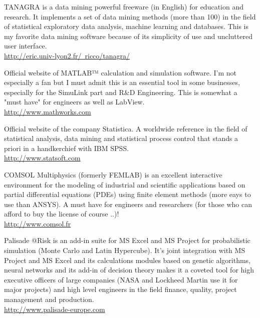 	{\Large {}}{\Large {}}{\Large {}}{\Large {}}\bcdfrance{} TANAGRA is a data mining powerful freeware (in English) for education and research. It implements a set of data mining methods (more than 100) in the field of statistical exploratory data analysis, machine learning and databases. This is my favorite  data mining software because of its simplicity of use and uncluttered user interface.\\
	\href{http://eric.univ-lyon2.fr/~ricco/tanagra/}{\color{blue}http://eric.univ-lyon2.fr/~ricco/tanagra/}
	
	{\Large {}}{\Large {}}{\Large {}} Official website of MATLAB™ calculation and simulation software. I'm not especially a fan but I must admit this is an essential tool in some businesses, especially for the SimuLink part and R\&D Engineering. This is somewhat a "must have" for engineers as well as LabView.\\
	\href{http://www.mathworks.com}{\color{blue}http://www.mathworks.com}
	
	\pagebreak
	{\Large {}}{\Large {}}{\Large {}}Official website of the company Statistica. A worldwide reference in the field of statistical analysis, data mining and statistical process control that stands a priori in a handkerchief with IBM SPSS.\\
	\href{http://www.statsoft.com}{\color{blue}http://www.statsoft.com}
	
	{\Large {}}{\Large {}}{\Large {}}{\Large {}}COMSOL Multiphysics (formerly FEMLAB) is an excellent interactive environment for the modeling of industrial and scientific applications based on partial differential equations (PDEs) using finite element methods (more eays to use than ANSYS). A must have for engineers and researchers (for those who can afford to buy the license of course ..)!\\
	\href{http://www.comsol.fr}{\color{blue}http://www.comsol.fr}
	
	{\Large {}}{\Large {}}{\Large {}}{\Large {}} Palisade @Risk is an add-in suite for MS Excel and MS Project for probabilistic simulation (Monte Carlo and Latin Hypercube). It's joint integration with MS Project and MS Excel and its calculations modules based on genetic algorithms, neural networks and its add-in of decision theory makes it a coveted tool for high executive officers of large companies (NASA and Lockheed Martin use it for major projects) and high level engineers in the field finance, quality, project management and production.\\
	\href{http://www.palisade-europe.com}{\color{blue}http://www.palisade-europe.com}
	
